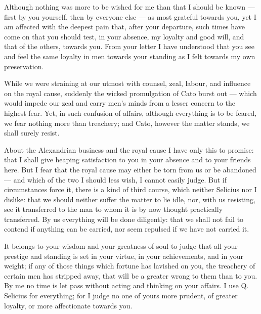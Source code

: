 

 Although nothing was more to be wished for me than that I should be known --- first by you yourself, then by everyone else --- as most grateful towards you, yet I am affected with the deepest pain that, after your departure, such times have come on that you should test, in your absence, my loyalty and good will, and that of the others, towards you. From your letter I have understood that you see and feel the same loyalty in men towards your standing as I felt towards my own preservation.

 While we were straining at our utmost with counsel, zeal, labour, and influence on the royal cause, suddenly the wicked promulgation of Cato burst out --- which would impede our zeal and carry men's minds from a lesser concern to the highest fear. Yet, in such confusion of affairs, although everything is to be feared, we fear nothing more than treachery; and Cato, however the matter stands, we shall surely resist.

 About the Alexandrian business and the royal cause I have only this to promise: that I shall give heaping satisfaction to you in your absence and to your friends here. But I fear that the royal cause may either be torn from us or be abandoned --- and which of the two I should less wish, I cannot easily judge. But if circumstances force it, there is a kind of third course, which neither Selicius nor I dislike: that we should neither suffer the matter to lie idle, nor, with us resisting, see it transferred to the man to whom it is by now thought practically transferred. By us everything will be done diligently: that we shall not fail to contend if anything can be carried, nor seem repulsed if we have not carried it.

 It belongs to your wisdom and your greatness of soul to judge that all your prestige and standing is set in your virtue, in your achievements, and in your weight; if any of those things which fortune has lavished on you, the treachery of certain men has stripped away, that will be a greater wrong to them than to you. By me no time is let pass without acting and thinking on your affairs. I use Q. Selicius for everything; for I judge no one of yours more prudent, of greater loyalty, or more affectionate towards you.

